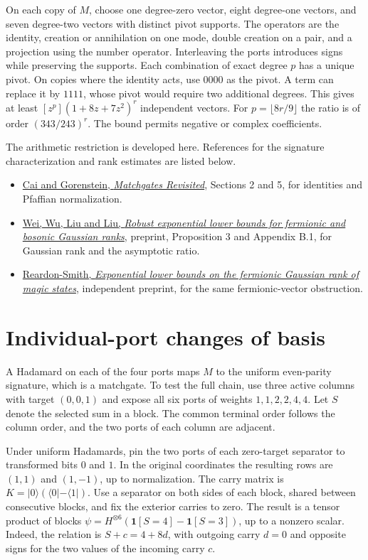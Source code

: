 \documentclass[11pt,a4paper]{article}
\numberwithin{equation}{section}
\begin{document}
On each copy of \(M\), choose one degree-zero vector, eight degree-one vectors, and seven degree-two vectors with distinct pivot supports. The operators are the identity, creation or annihilation on one mode, double creation on a pair, and a projection using the number operator. Interleaving the ports introduces signs while preserving the supports. Each combination of exact degree \(p\) has a unique pivot. On copies where the identity acts, use \(0000\) as the pivot. A term can replace it by \(1111\), whose pivot would require two additional degrees. This gives at least \([z^p](1+8z+7z^2)^r\) independent vectors. For \(p=\lfloor 8r/9\rfloor\) the ratio is of order \((343/243)^r\). The bound permits negative or complex coefficients.

The arithmetic restriction is developed here. References for the signature characterization and rank estimates are listed below.

\begin{itemize}
\item
  \href{https://theoryofcomputing.org/articles/v010a007/}{Cai and Gorenstein, \emph{Matchgates Revisited}}, Sections 2 and 5, for identities and Pfaffian normalization.
\item
  \href{https://arxiv.org/abs/2610.02172}{Wei, Wu, Liu and Liu, \emph{Robust exponential lower bounds for fermionic and bosonic Gaussian ranks}}, preprint, Proposition 3 and Appendix B.1, for Gaussian rank and the asymptotic ratio.
\item
  \href{https://arxiv.org/abs/2610.03699}{Reardon-Smith, \emph{Exponential lower bounds on the fermionic Gaussian rank of magic states}}, independent preprint, for the same fermionic-vector obstruction.
\end{itemize}

\section{Individual-port changes of basis}\label{individual-port-changes-of-basis}

A Hadamard on each of the four ports maps \(M\) to the uniform even-parity signature, which is a matchgate. To test the full chain, use three active columns with target \((0,0,1)\) and expose all six ports of weights \(1,1,2,2,4,4\). Let \(S\) denote the selected sum in a block. The common terminal order follows the column order, and the two ports of each column are adjacent.

Under uniform Hadamards, pin the two ports of each zero-target separator to transformed bits \(0\) and \(1\). In the original coordinates the resulting rows are \((1,1)\) and \((1,-1)\), up to normalization. The carry matrix is \(K=|0\rangle(\langle0|-\langle1|)\). Use a separator on both sides of each block, shared between consecutive blocks, and fix the exterior carries to zero. The result is a tensor product of blocks \(\psi=H^{\otimes6}(\mathbf 1[S=4]-\mathbf 1[S=3])\), up to a nonzero scalar. Indeed, the relation is \(S+c=4+8d\), with outgoing carry \(d=0\) and opposite signs for the two values of the incoming carry \(c\).
\end{document}
